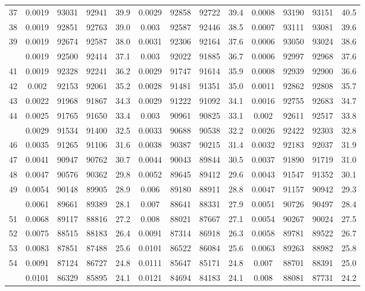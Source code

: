 \documentclass[
  14pt,
]{article}
\begin{document}
\begin{longtable}[t]{lcccccccccccc}
37 & 0.0019 & 93031 & 92941 & 39.9 & 0.0029 & 92858 & 92722 & 39.4 & 0.0008 & 93190 & 93151 & 40.5\\
38 & 0.0019 & 92851 & 92763 & 39.0 & 0.003 & 92587 & 92446 & 38.5 & 0.0007 & 93111 & 93081 & 39.6\\
39 & 0.0019 & 92674 & 92587 & 38.0 & 0.0031 & 92306 & 92164 & 37.6 & 0.0006 & 93050 & 93024 & 38.6\\
\addlinespace
40 & 0.0019 & 92500 & 92414 & 37.1 & 0.003 & 92022 & 91885 & 36.7 & 0.0006 & 92997 & 92968 & 37.6\\
41 & 0.0019 & 92328 & 92241 & 36.2 & 0.0029 & 91747 & 91614 & 35.9 & 0.0008 & 92939 & 92900 & 36.6\\
42 & 0.002 & 92153 & 92061 & 35.2 & 0.0028 & 91481 & 91351 & 35.0 & 0.0011 & 92862 & 92808 & 35.7\\
43 & 0.0022 & 91968 & 91867 & 34.3 & 0.0029 & 91222 & 91092 & 34.1 & 0.0016 & 92755 & 92683 & 34.7\\
44 & 0.0025 & 91765 & 91650 & 33.4 & 0.003 & 90961 & 90825 & 33.1 & 0.002 & 92611 & 92517 & 33.8\\
\addlinespace
45 & 0.0029 & 91534 & 91400 & 32.5 & 0.0033 & 90688 & 90538 & 32.2 & 0.0026 & 92422 & 92303 & 32.8\\
46 & 0.0035 & 91265 & 91106 & 31.6 & 0.0038 & 90387 & 90215 & 31.4 & 0.0032 & 92183 & 92037 & 31.9\\
47 & 0.0041 & 90947 & 90762 & 30.7 & 0.0044 & 90043 & 89844 & 30.5 & 0.0037 & 91890 & 91719 & 31.0\\
48 & 0.0047 & 90576 & 90362 & 29.8 & 0.0052 & 89645 & 89412 & 29.6 & 0.0043 & 91547 & 91352 & 30.1\\
49 & 0.0054 & 90148 & 89905 & 28.9 & 0.006 & 89180 & 88911 & 28.8 & 0.0047 & 91157 & 90942 & 29.3\\
\addlinespace
50 & 0.0061 & 89661 & 89389 & 28.1 & 0.007 & 88641 & 88331 & 27.9 & 0.0051 & 90726 & 90497 & 28.4\\
51 & 0.0068 & 89117 & 88816 & 27.2 & 0.008 & 88021 & 87667 & 27.1 & 0.0054 & 90267 & 90024 & 27.5\\
52 & 0.0075 & 88515 & 88183 & 26.4 & 0.0091 & 87314 & 86918 & 26.3 & 0.0058 & 89781 & 89522 & 26.7\\
53 & 0.0083 & 87851 & 87488 & 25.6 & 0.0101 & 86522 & 86084 & 25.6 & 0.0063 & 89263 & 88982 & 25.8\\
54 & 0.0091 & 87124 & 86727 & 24.8 & 0.0111 & 85647 & 85171 & 24.8 & 0.007 & 88701 & 88391 & 25.0\\
\addlinespace
55 & 0.0101 & 86329 & 85895 & 24.1 & 0.0121 & 84694 & 84183 & 24.1 & 0.008 & 88081 & 87731 & 24.2\\

\end{longtable}
\end{document}
